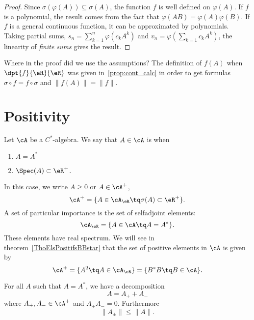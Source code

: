 \begin{proof}
Since $\sigma(\varphi(A))\subseteq\sigma(A)$, the function $f$ is well defined on $\varphi(A)$. If $f$ is a polynomial, the result comes from the fact that $\varphi(AB)=\varphi(A)\varphi(B)$. If $f$ is a general continuous function, it can be approximated by polynomials. Taking partial sums, $s_n=\sum_{k=1}^n\varphi(c_kA^k)$ and $v_n=\varphi(\sum_{k=1}c_kA^k)$, the linearity of \emph{finite sums} gives the result.
\end{proof}

Where in the proof did we use the assumptions? The definition of $f(A)$ when $\dpt{f}{\eR}{\eR}$ was given in~\ref{prop:cont_calc} in order to get formulas $\sigma\circ f=f\circ\sigma$ and $\| f(A) \|=\| f \|$.

\section{Positivity}

Let $\cA$ be a $C^*$-algebra. We say that $A\in\cA$ is  when
\begin{enumerate}
\item  $A=A^*$
\item  $\Spec(A)\subset\eR^+$.
\end{enumerate}
In this case, we write $A\geq 0$ or $A\in\cA^+$,
\[
  \cA^+=\{ A\in\cA_{\eR}\tq\sigma(A)\subset\eR^+ \}.
\]
A set of particular importance is the set of selfadjoint elements:
\begin{equation}
    \cA_{\eR}=\{ A\in\cA\tq A=A^* \}.
\end{equation}
These elements have real spectrum. We will see in theorem~\ref{ThoElsPositifsBBstar} that the set of positive elements in $\cA$ is given by
\begin{equation}
    \cA^+=\{ A^2\tq A\in\cA_{\eR} \}=\{ B^*B\tq B\in\cA \}.
\end{equation}

\begin{lemma}
For all $A$ such that $A=A^*$, we have a decomposition
\[
  A=A_++A_-
\]
where $A_+,A_-\in\cA^+$ and $A_+A_-=0$. Furthermore
\[
  \| A_{\pm} \|\leq \| A \|.
\]
 \label{lem:AsAdecm}
\end{lemma}

